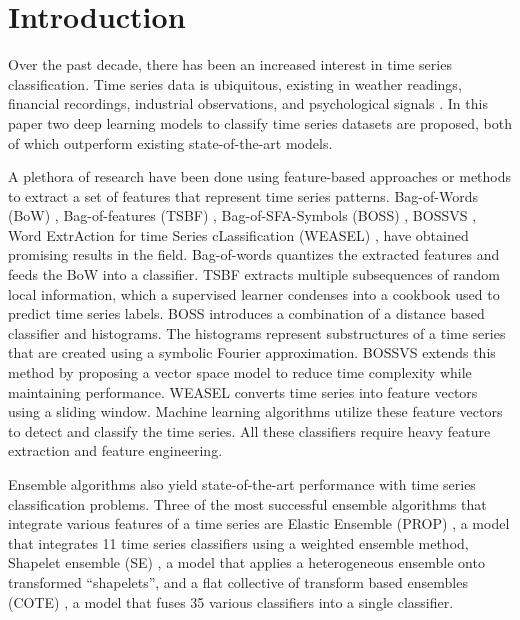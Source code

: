 \documentclass[article]{IEEEtran}
\begin{document}
\section{Introduction}


Over the past decade, there has been an increased interest in time series classification. Time series data is ubiquitous, existing in weather readings, financial recordings, industrial observations, and psychological signals \cite{kadous2002temporal}. In this paper two deep learning models to classify time series datasets are proposed, both of which outperform existing state-of-the-art models.
\par A plethora of research have been done using feature-based approaches or methods to extract a set of features that represent time series patterns. Bag-of-Words (BoW) \cite{Lin_2007}, Bag-of-features (TSBF) \cite{Baydogan_2013}, Bag-of-SFA-Symbols (BOSS) \cite{Sch_fer_2014}, BOSSVS \cite{schafer2016scalable}, Word ExtrAction for time Series cLassification (WEASEL) \cite{Schafer_2017}, have obtained promising results in the field. Bag-of-words quantizes the extracted features and feeds the BoW into a classifier. TSBF extracts multiple subsequences of random local information, which a supervised learner condenses into a cookbook used to predict time series labels. BOSS introduces a combination of a distance based classifier and histograms. The histograms represent substructures of a time series that are created using a symbolic Fourier approximation. BOSSVS extends this method by proposing a vector space model to reduce time complexity while maintaining performance.  WEASEL converts time series into feature vectors using a sliding window. Machine learning algorithms utilize these feature vectors to detect and classify the time series.  All these classifiers require heavy feature extraction and feature engineering. \par Ensemble algorithms also yield state-of-the-art performance with time series classification problems. Three of the most successful ensemble algorithms that integrate various features of a time series are Elastic Ensemble (PROP) \cite{Lines_2014}, a model that integrates 11 time series classifiers using a weighted ensemble method, Shapelet ensemble (SE) \cite{bagnall2015time}, a model that applies a heterogeneous ensemble onto transformed “shapelets”, and a flat collective of transform based ensembles (COTE) \cite{bagnall2015time}, a model that fuses 35 various classifiers into a single classifier. 
\end{document}

